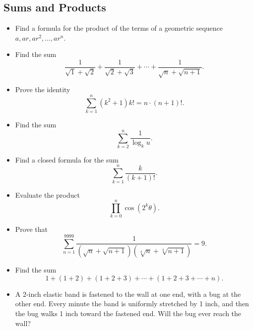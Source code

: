 \documentclass[12pt]{article}
\begin{document}
\subsection{Sums and Products}
\begin{itemize}
  \item Find a formula for the product of the terms of a geometric sequence $a, ar, ar^2, \ldots, ar^n$.

  \item Find the sum
  \[
  \frac{1}{\sqrt{1} + \sqrt{2}} + \frac{1}{\sqrt{2} + \sqrt{3}} + \cdots + \frac{1}{\sqrt{n} + \sqrt{n+1}}.
  \]

  \item Prove the identity
  \[
  \sum_{k=1}^n (k^2 + 1)k! = n \cdot (n+1)!.
  \]

  \item Find the sum
  \[
  \sum_{k=2}^n \frac{1}{\log_k u}.
  \]

  \item Find a closed formula for the sum
  \[
  \sum_{k=1}^n \frac{k}{(k+1)!}.
  \]

  \item Evaluate the product
  \[
  \prod_{k=0}^n \cos(2^k \theta).
  \]

  \item Prove that
  \[
  \sum_{n=1}^{9999} \frac{1}{(\sqrt{n}+\sqrt{n+1})(\sqrt[4]{n}+\sqrt[4]{n+1})} = 9.
  \]

  \item Find the sum
  \[
  1 + (1+2) + (1+2+3) + \cdots + (1+2+3+\cdots+n).
  \]

  \item  A 2-inch elastic band is fastened to the wall at one end, with a bug at the other end. Every minute the band is uniformly stretched by 1 inch, and then the bug walks 1 inch toward the fastened end. Will the bug ever reach the wall?
\end{itemize}
\end{document}
